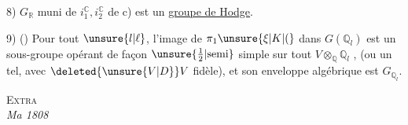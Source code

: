 
8) $G_{\mathbb R}$ muni de $i_1^{\mathbb C},i_2^{\mathbb C}$ de c) est un \uline{groupe de Hodge}.

9) () Pour tout $\unsure{l|\ell}$, l'image de $\pi_1\unsure{\xi|K|\mathopen{(}}$ dans $G(\mathbb Q_l)$ est un sous-groupe opérant de façon $\unsure{\frac12|\text{semi}}$ simple sur tout  $V\otimes_{\mathbb Q}\mathbb Q_l$ , (ou un tel, avec $\deleted{\unsure{V|D}}V$  fidèle), et son enveloppe algébrique est $G_{\mathbb Q_l}$.


{\centering \textsc{Extra }\\
\textit{Ma 1808}\par}
